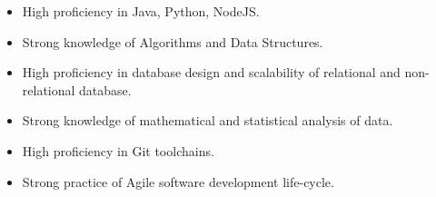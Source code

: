 \documentclass[12pt]{article} %
\begin{document}
\begin{paracol}{2}
	
	
	
	
	
	

\begin{itemize}
	\item High proficiency in Java, Python, NodeJS.
	\item Strong knowledge of Algorithms and Data Structures.
	\item High proficiency in database design and scalability of relational and non-relational database.
	\item Strong knowledge of mathematical and statistical analysis of data.
	\item High proficiency in Git toolchains.
	\item Strong practice of Agile software development life-cycle.
\end{itemize}	







\end{paracol}
\end{document}
